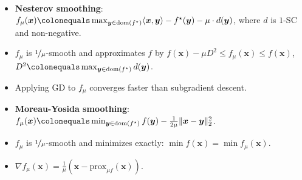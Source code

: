 \documentclass[8pt,a4paper]{extarticle}
\renewcommand{\vec}[1]{\bm{#1}}
\newcommand{\dom}[1]{\mathrm{dom}(#1)}
\newenvironment{topic}[1]
{\textbf{\sffamily \colorbox{black}{\rlap{\textbf{\textcolor{white}{#1}}}\hspace{\linewidth}\hspace{-2\fboxsep}}} \\ \vspace{0.2cm}}
{}
\begin{document}
\begin{multicols*}{2}
    \begin{topic}{Smoothing}
        \begin{itemize}
            \item \textbf{Nesterov smoothing}: $f_{\mu}(\vec{x}) \colonequals \max_{\vec{y} \in \dom{f^\star}} \langle \vec{x}, \vec{y} \rangle - f^\star(\vec{y}) - \mu \cdot d(\vec{y})$, where $d$ is $1$-SC and non-negative.
            \item $f_{\mu}$ is $\nicefrac{1}{\mu}$-smooth and approximates $f$ by $f(\vec{x}) - \mu D^2 \leq f_{\mu}(\vec{x}) \leq f(\vec{x})$, $D^2 \colonequals \max_{\vec{y} \in \dom{f^\star}} d(\vec{y})$.
            \item Applying GD to $f_{\mu}$ converges faster than subgradient descent.
            \item \textbf{Moreau-Yosida smoothing}: $f_{\mu}(\vec{x}) \colonequals \min_{\vec{y} \in \dom{f^\star}} f(\vec{y}) - \frac{1}{2 \mu} \| \vec{x} - \vec{y} \|_2^2$.
            \item $f_{\mu}$ is $\nicefrac{1}{\mu}$-smooth and minimizes exactly: $\min f(\vec{x}) = \min f_{\mu}(\vec{x})$.
            \item $\nabla f_{\mu}(\vec{x}) = \frac{1}{\mu}(\vec{x} - \mathrm{prox}_{\mu f}(\vec{x}))$.
        \end{itemize}
    \end{topic}


\end{multicols*}
\end{document}

